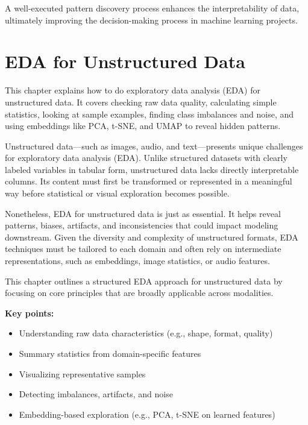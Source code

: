 \documentclass[12pt,openany]{book}
\begin{document}
A well-executed pattern discovery process enhances the interpretability of data, ultimately improving the decision-making process in machine learning projects.




\chapter{EDA for Unstructured Data}

\begin{summarybox}
This chapter explains how to do exploratory data analysis (EDA) for unstructured data. It covers checking raw data quality, calculating simple statistics, looking at sample examples, finding class imbalances and noise, and using embeddings like PCA, t-SNE, and UMAP to reveal hidden patterns. 
\end{summarybox}

Unstructured data—such as images, audio, and text—presents unique 
challenges for exploratory data analysis (EDA). Unlike structured datasets 
with clearly labeled variables in tabular form, unstructured data lacks 
directly interpretable columns. Its content must first be transformed 
or represented in a meaningful way before statistical or visual 
exploration becomes possible. \newline

Nonetheless, EDA for unstructured data is just as essential. It helps 
reveal patterns, biases, artifacts, and inconsistencies that could 
impact modeling downstream. Given the diversity and complexity of 
unstructured formats, EDA techniques must be tailored to each domain 
and often rely on intermediate representations, such as embeddings, 
image statistics, or audio features. \newline

This chapter outlines a structured EDA approach for unstructured data 
by focusing on core principles that are broadly applicable across 
modalities.
\newline

\textbf{Key points:}
\begin{itemize}
    \item Understanding raw data characteristics (e.g., shape, format, quality)
    \item Summary statistics from domain-specific features 
    \item Visualizing representative samples
    \item Detecting imbalances, artifacts, and noise
    \item Embedding-based exploration (e.g., PCA, t-SNE on learned features)
\end{itemize}
\end{document}
